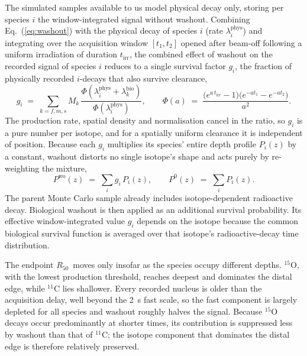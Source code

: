 \documentclass[11pt]{article}
\newcommand{\Rc}{\ensuremath{R_{50}}}
\begin{document}
The simulated samples available to us model physical decay only, storing per species
$i$ the window-integrated signal without washout. Combining
Eq.~(\ref{eq:washout}) with the physical decay of species $i$ (rate
$\lambda_i^{\mathrm{phys}}$) and integrating over the acquisition window
$[t_1,t_2]$ opened after beam-off following a uniform irradiation of duration $t_{\mathrm{irr}}$,
the combined effect of washout on the recorded signal of species $i$ reduces to a
single survival factor $g_i$, the fraction of physically recorded $i$-decays
that also survive clearance,
%
\begin{equation}
  g_i \;=\; \sum_{k=f,m,s} M_k\,
  \frac{\Phi\!\left(\lambda_i^{\mathrm{phys}}+\lambda_k^{\mathrm{bio}}\right)}
       {\Phi\!\left(\lambda_i^{\mathrm{phys}}\right)},
  \qquad
  \Phi(a) \;=\;
  \frac{\bigl(e^{a\,t_{\mathrm{irr}}}-1\bigr)
        \bigl(e^{-a t_1}-e^{-a t_2}\bigr)}{a^{2}} .
  \label{eq:gfactor}
\end{equation}
%
The production rate, spatial density and normalisation cancel in the ratio, so
$g_i$ is a pure number per isotope, and for a spatially uniform clearance it is
independent of position. 
Because each $g_i$ multiplies its species' entire depth profile $P_i(z)$ by a
constant, washout distorts no single isotope's shape and acts purely by
re-weighting the mixture,
%
\begin{equation}
  P^{\mathrm{wo}}(z) \;=\; \sum_i g_i\,P_i(z),
  \qquad
  P^{0}(z) \;=\; \sum_i P_i(z).
  \label{eq:mix}
\end{equation}
%
The parent Monte Carlo sample already includes isotope-dependent radioactive
decay. Biological washout is then applied as an additional survival
probability. Its effective window-integrated value $g_i$ depends on the isotope
because the common biological survival function is averaged over that
isotope's radioactive-decay time distribution.

The endpoint \Rc\ moves only insofar as the species occupy different depths.
$^{15}$O, with the lowest production threshold, reaches deepest and dominates the
distal edge, while $^{11}$C lies shallower. Every recorded nucleus is older than
the acquisition delay, well beyond the \SI{2}{\second} fast scale, so the fast component
is largely depleted for all species and washout roughly halves the signal.
Because $^{15}$O decays occur predominantly at shorter times, its contribution is
suppressed less by washout than that of $^{11}$C; the isotope component that
dominates the distal edge is therefore relatively preserved.
\end{document}
